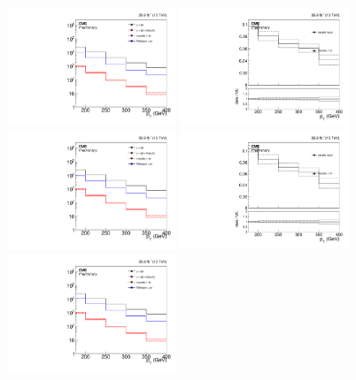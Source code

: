 \begin{figure}[htbp]
  \begin{center}
    \includegraphics[width=0.45\textwidth]{Analysis/Figures/hfake/distributionsNom.pdf}
    \includegraphics[width=0.45\textwidth]{Analysis/Figures/hfake/tfactorNom.pdf}
    \includegraphics[width=0.45\textwidth]{Analysis/Figures/hfake/distributionsTight.pdf}
    \includegraphics[width=0.45\textwidth]{Analysis/Figures/hfake/tfactorTight.pdf}
    \includegraphics[width=0.45\textwidth]{Analysis/Figures/hfake/distributionsLoose.pdf}

\end{center}
\end{figure}
